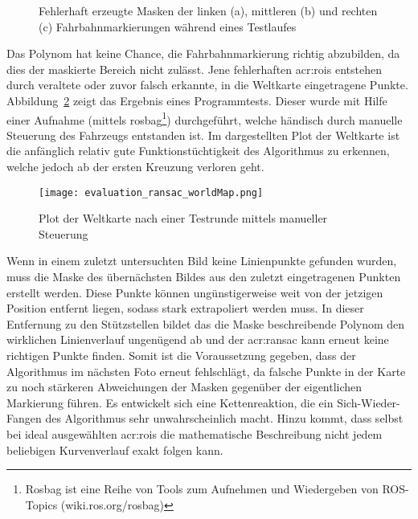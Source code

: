 \begin{figure}[H]
	\centering
	\quad
	\quad
	\caption{Fehlerhaft erzeugte Masken der linken (a), mittleren (b) und rechten (c) Fahrbahnmarkierungen während eines Testlaufes}
	\label{fig:evaluation_ransac_ransac}
\end{figure} 

Das Polynom hat keine Chance, die Fahrbahnmarkierung richtig abzubilden, da dies der maskierte Bereich nicht zulässt. Jene fehlerhaften \glspl{acr:roi} entstehen durch veraltete oder zuvor falsch erkannte, in die Weltkarte eingetragene Punkte. Abbildung~\ref{evaluation_ransac_weltkarte} zeigt das Ergebnis eines Programmtests. Dieser wurde mit Hilfe einer Aufnahme (mittels rosbag\footnote{Rosbag ist eine Reihe von Tools zum Aufnehmen und Wiedergeben von ROS-Topics (wiki.ros.org/rosbag)}) durchgeführt, welche händisch durch manuelle Steuerung des Fahrzeugs entstanden ist. Im dargestellten Plot der Weltkarte ist die anfänglich relativ gute Funktionstüchtigkeit des Algorithmus zu erkennen, welche jedoch ab der ersten Kreuzung verloren geht.

\begin{figure}[H] %
	\centering
	\texttt{[image: evaluation\_ransac\_worldMap.png]}
	\caption{Plot der Weltkarte nach einer Testrunde mittels manueller Steuerung}
	\label{evaluation_ransac_weltkarte}
\end{figure} 

Wenn in einem zuletzt untersuchten Bild keine Linienpunkte gefunden wurden, muss die Maske des übernächsten Bildes aus den zuletzt eingetragenen Punkten erstellt werden. Diese Punkte können ungünstigerweise weit von der jetzigen Position entfernt liegen, sodass stark extrapoliert werden muss. In dieser Entfernung zu den Stützstellen bildet das die Maske beschreibende Polynom den wirklichen Linienverlauf ungenügend ab und der \gls{acr:ransac} kann erneut keine richtigen Punkte finden. Somit ist die Voraussetzung gegeben, dass der Algorithmus im nächsten Foto erneut fehlschlägt, da falsche Punkte in der Karte zu noch stärkeren Abweichungen der Masken gegenüber der eigentlichen Markierung führen. Es entwickelt sich eine Kettenreaktion, die ein \glqq Sich-Wieder-Fangen\grqq{} des Algorithmus sehr unwahrscheinlich macht. 
Hinzu kommt, dass selbst bei ideal ausgewählten \glspl{acr:roi} die mathematische Beschreibung nicht jedem beliebigen Kurvenverlauf exakt folgen kann. 


